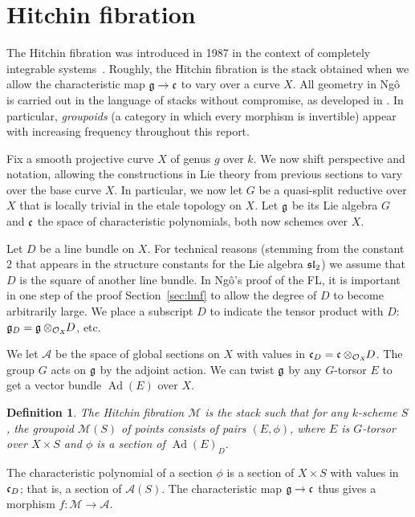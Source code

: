 \documentclass[brochure,english,12pt]{bourbaki}
\newtheorem{definition}[equation]{Definition}
\def\op#1{{\operatorname{#1}}}
\def\sl{\frak{sl}}
\def\g{\frak{g}}
\def\cc{\frak{c}}
\def\A{{\mathcal A}}
\def\M{{\mathcal M}}
\def\O{{\mathcal O}}
\begin{document}
\section{Hitchin fibration}

The Hitchin fibration was introduced in 1987 in the context of
completely integrable systems~\cite{Hitchin:87}.  Roughly, the Hitchin
fibration is the stack obtained when we allow the characteristic map
$\g\to\cc$ to vary over a curve $X$.  All geometry in Ng\^o is carried
out in the language of stacks without compromise, as developed in
\cite{LMB:2000}.  In particular, {\it groupoids} (a category in which
every morphism is invertible) appear with increasing frequency throughout this report.

Fix a smooth projective curve $X$ of genus $g$ over $k$.  We now shift
perspective and notation, allowing the constructions in Lie theory
from previous sections to vary over the base curve $X$.  In
particular, we now let $G$ be a quasi-split reductive over $X$ that is
locally trivial in the etale topology on $X$.  Let $\g$ be its Lie
algebra $G$ and $\cc$ the space of characteristic polynomials, both now schemes over $X$.

Let $D$ be a line bundle on $X$. For technical reasons (stemming from
the constant $2$ that appears in the structure constants for the Lie
algebra $\sl_2$) we assume that $D$ is the square of another line
bundle.  In Ng\^o's proof of the FL, it is important in one step of
the proof Section~\ref{sec:lmf} to allow the degree of $D$ to become
arbitrarily large.  We place a subscript $D$ to indicate the tensor
product with $D$: $\g_D = \g\otimes_{\O_X}\!\!D$, etc.

We let $\A$ be the space of global sections on $X$ with values in
$\cc_D=\cc\otimes_{\O_X}\!\!D$.  The group $G$ acts on $\g$ by the
adjoint action.  We can twist $\g$ by any $G$-torsor $E$ to get a
vector bundle $\op{Ad}(E)$ over $X$.

\begin{definition}
The Hitchin fibration $\M$ is the stack
such that for any $k$-scheme $S$, the groupoid $\M(S)$ of points consists
of pairs $(E,\phi)$, where $E$ is $G$-torsor over $X\times S$ and $\phi$ is a section of
$\op{Ad}(E)_D$.
\end{definition}

The characteristic polynomial of a section $\phi$ is a section of
$X\times S$ with values in $\cc_D$; that is, a section of $\A(S)$.
The characteristic map $\g\to\cc$ thus gives a morphism $f:\M\to\A$.
\end{document}
